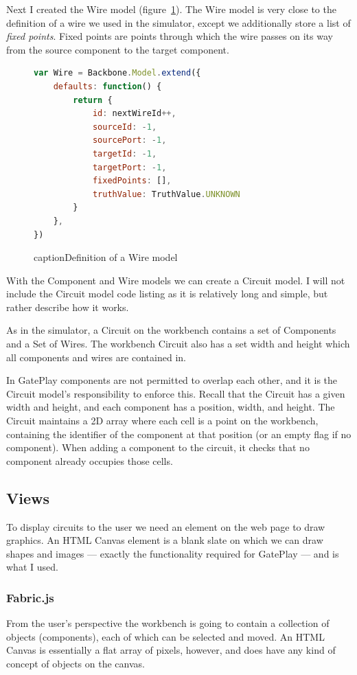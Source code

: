 Next I created the Wire model (figure~\ref{fig:wiremodel}). The Wire model is very close to the definition of a wire we used in the simulator, except we additionally store a list of \textit{fixed points}. Fixed points are points through which the wire passes on its way from the source component to the target component.

\begin{figure}
\begin{lstlisting}[language=JavaScript]
var Wire = Backbone.Model.extend({
	defaults: function() {
    	return {
        	id: nextWireId++,
        	sourceId: -1,
        	sourcePort: -1,
       	 	targetId: -1,
        	targetPort: -1,
        	fixedPoints: [],
        	truthValue: TruthValue.UNKNOWN
    	}
	},
})
\end{lstlisting}
caption{Definition of a Wire model}
\label{fig:wiremodel}
\end{figure}

With the Component and Wire models we can create a Circuit model. I will not include the Circuit model code listing as it is relatively long and simple, but rather describe how it works. 

As in the simulator, a Circuit on the workbench contains a set of Components and a Set of Wires. The workbench Circuit also has a set width and height which all components and wires are contained in.

In GatePlay components are not permitted to overlap each other, and it is the Circuit model's responsibility to enforce this. Recall that the Circuit has a given width and height, and each component has a position, width, and height. The Circuit maintains a 2D array where each cell is a point on the workbench, containing the identifier of the component at that position (or an empty flag if no component). When adding a component to the circuit, it checks that no component already occupies those cells.

\subsection{Views}
To display circuits to the user we need an element on the web page to draw graphics. An HTML Canvas element is a blank slate on which we can draw shapes and images --- exactly the functionality required for GatePlay --- and is what I used.

\subsubsection{Fabric.js}
From the user's perspective the workbench is going to contain a collection of objects (components), each of which can be selected and moved. An HTML Canvas is essentially a flat array of pixels, however, and does have any kind of concept of objects on the canvas.

